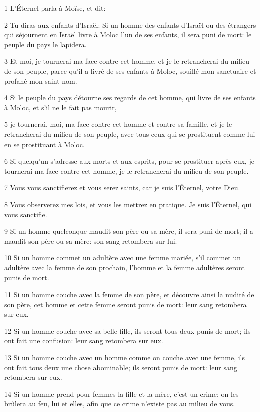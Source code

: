 \par 1 L'Éternel parla à Moïse, et dit:
\par 2 Tu diras aux enfants d'Israël: Si un homme des enfants d'Israël ou des étrangers qui séjournent en Israël livre à Moloc l'un de ses enfants, il sera puni de mort: le peuple du pays le lapidera.
\par 3 Et moi, je tournerai ma face contre cet homme, et je le retrancherai du milieu de son peuple, parce qu'il a livré de ses enfants à Moloc, souillé mon sanctuaire et profané mon saint nom.
\par 4 Si le peuple du pays détourne ses regards de cet homme, qui livre de ses enfants à Moloc, et s'il ne le fait pas mourir,
\par 5 je tournerai, moi, ma face contre cet homme et contre sa famille, et je le retrancherai du milieu de son peuple, avec tous ceux qui se prostituent comme lui en se prostituant à Moloc.
\par 6 Si quelqu'un s'adresse aux morts et aux esprits, pour se prostituer après eux, je tournerai ma face contre cet homme, je le retrancherai du milieu de son peuple.
\par 7 Vous vous sanctifierez et vous serez saints, car je suis l'Éternel, votre Dieu.
\par 8 Vous observerez mes lois, et vous les mettrez en pratique. Je suis l'Éternel, qui vous sanctifie.
\par 9 Si un homme quelconque maudit son père ou sa mère, il sera puni de mort; il a maudit son père ou sa mère: son sang retombera sur lui.
\par 10 Si un homme commet un adultère avec une femme mariée, s'il commet un adultère avec la femme de son prochain, l'homme et la femme adultères seront punis de mort.
\par 11 Si un homme couche avec la femme de son père, et découvre ainsi la nudité de son père, cet homme et cette femme seront punis de mort: leur sang retombera sur eux.
\par 12 Si un homme couche avec sa belle-fille, ils seront tous deux punis de mort; ils ont fait une confusion: leur sang retombera sur eux.
\par 13 Si un homme couche avec un homme comme on couche avec une femme, ils ont fait tous deux une chose abominable; ils seront punis de mort: leur sang retombera sur eux.
\par 14 Si un homme prend pour femmes la fille et la mère, c'est un crime: on les brûlera au feu, lui et elles, afin que ce crime n'existe pas au milieu de vous.
